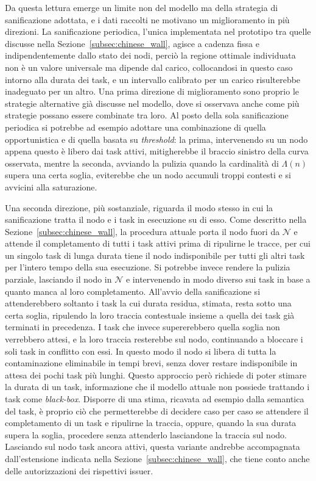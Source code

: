 Da questa lettura emerge un limite non del modello ma della strategia di sanificazione adottata, e i dati raccolti ne motivano un miglioramento in più direzioni. La sanificazione periodica, l'unica implementata nel prototipo tra quelle discusse nella Sezione~\ref{subsec:chinese_wall}, agisce a cadenza fissa e indipendentemente dallo stato dei nodi, perciò la regione ottimale individuata non è un valore universale ma dipende dal carico, collocandosi in questo caso intorno alla durata dei task, e un intervallo calibrato per un carico risulterebbe inadeguato per un altro. Una prima direzione di miglioramento sono proprio le strategie alternative già discusse nel modello, dove si osservava anche come più strategie possano essere combinate tra loro. Al posto della sola sanificazione periodica si potrebbe ad esempio adottare una combinazione di quella opportunistica e di quella basata su \emph{threshold}: la prima, intervenendo su un nodo appena questo è libero dai task attivi, mitigherebbe il braccio sinistro della curva osservata, mentre la seconda, avviando la pulizia quando la cardinalità di $\Lambda(n)$ supera una certa soglia, eviterebbe che un nodo accumuli troppi contesti e si avvicini alla saturazione.

Una seconda direzione, più sostanziale, riguarda il modo stesso in cui la sanificazione tratta il nodo e i task in esecuzione su di esso. Come descritto nella Sezione~\ref{subsec:chinese_wall}, la procedura attuale porta il nodo fuori da $\mathcal{N}$ e attende il completamento di tutti i task attivi prima di ripulirne le tracce, per cui un singolo task di lunga durata tiene il nodo indisponibile per tutti gli altri task per l'intero tempo della sua esecuzione. Si potrebbe invece rendere la pulizia parziale, lasciando il nodo in $\mathcal{N}$ e intervenendo in modo diverso sui task in base a quanto manca al loro completamento. All'avvio della sanificazione si attenderebbero soltanto i task la cui durata residua, stimata, resta sotto una certa soglia, ripulendo la loro traccia contestuale insieme a quella dei task già terminati in precedenza. I task che invece supererebbero quella soglia non verrebbero attesi, e la loro traccia resterebbe sul nodo, continuando a bloccare i soli task in conflitto con essi. In questo modo il nodo si libera di tutta la contaminazione eliminabile in tempi brevi, senza dover restare indisponibile in attesa dei pochi task più lunghi. Questo approccio però richiede di poter stimare la durata di un task, informazione che il modello attuale non possiede trattando i task come \emph{black-box}. Disporre di una stima, ricavata ad esempio dalla semantica del task, è proprio ciò che permetterebbe di decidere caso per caso se attendere il completamento di un task e ripulirne la traccia, oppure, quando la sua durata supera la soglia, procedere senza attenderlo lasciandone la traccia sul nodo. Lasciando sul nodo task ancora attivi, questa variante andrebbe accompagnata dall'estensione indicata nella Sezione~\ref{subsec:chinese_wall}, che tiene conto anche delle autorizzazioni dei rispettivi issuer.

